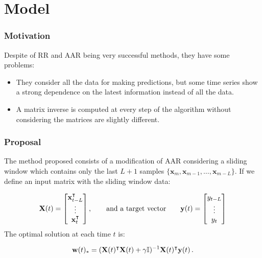 \section{Model} %
\label{sec:Method}

\begin{frame}
     \frametitle{Motivation}
    Despite of RR and AAR being very successful methods, they have
    some problems:
    \begin{itemize}
        \item They consider all the data for making predictions, but some time series show a strong
    dependence on the latest information instead of all the data.
        \item A matrix inverse is computed at every step of the
        algorithm without considering the matrices are slightly different.
    \end{itemize}
\end{frame}


\begin{frame}
     \frametitle{Proposal}
    
    The method proposed consists of a modification of AAR considering a
    {\color{red}sliding window} which contains only the last $L+1$ samples 
    $\{\mathbf{x}_m, \mathbf{x}_{m-1}, \dots, \mathbf{x}_{m-L} \}$. 
    If we define an input matrix with the sliding window data:

    \begin{equation*}
    \mathbf{X}(t) = 
    \begin{bmatrix}
    \mathbf{x}_{t-L}^{\intercal}\\
    \vdots \\ 
    \mathbf{x}_t^{\intercal} 
    \end{bmatrix} 
    , \qquad \text{and a target vector} \qquad 
    {\bf y}(t) =
    \begin{bmatrix}
    y_{t-L} \\
    \vdots \\ 
    y_t 
    \end{bmatrix} 
    \end{equation*}
    The optimal solution at each time $t$ is:

    \begin{equation*}
    {\bf w}(t)_*=({\bf
    X}(t)^\intercal{\bf X}(t)+\gamma \mathbb{I})^{-1}{\bf
    X}(t)^\intercal{\bf y}(t) \, .  
    \end{equation*} 
    
\end{frame}

